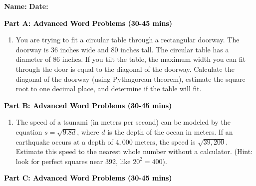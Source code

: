 \documentclass[12pt, letterpaper, fleqn]{article}
\begin{document}
\textbf{Name:} \underline{\hspace{5cm}}
\hfill
\textbf{Date:} \underline{\hspace{3cm}}\\


\begin{tcolorbox}[colback=customteal!20]
\large\textcolor{black}{\textbf{Part A: Advanced Word Problems (30-45 mins)}}
\end{tcolorbox}

\vspace{3mm}

\begin{enumerate}[itemsep=5.5cm, leftmargin=0.6cm]
\item You are trying to fit a circular table through a rectangular doorway. The doorway is $36\text{ inches}$ wide and $80\text{ inches}$ tall. The circular table has a diameter of $86\text{ inches}$. If you tilt the table, the maximum width you can fit through the door is equal to the diagonal of the doorway. Calculate the diagonal of the doorway (using Pythagorean theorem), estimate the square root to one decimal place, and determine if the table will fit.
\end{enumerate}

\newpage

\begin{tcolorbox}[colback=customteal!20]
\large\textcolor{black}{\textbf{Part B: Advanced Word Problems (30-45 mins)}}
\end{tcolorbox}

\vspace{3mm}

\begin{enumerate}[itemsep=5.5cm, leftmargin=0.6cm, resume]
\item The speed of a tsunami (in meters per second) can be modeled by the equation $s = \sqrt{9.8d}$, where $d$ is the depth of the ocean in meters. If an earthquake occurs at a depth of $4,000\text{ meters}$, the speed is $\sqrt{39,200}$. Estimate this speed to the nearest whole number without a calculator. (Hint: look for perfect squares near 392, like $20^2=400$).
\end{enumerate}

\newpage

\begin{tcolorbox}[colback=customteal!20]
\large\textcolor{black}{\textbf{Part C: Advanced Word Problems (30-45 mins)}}
\end{tcolorbox}
\end{document}
